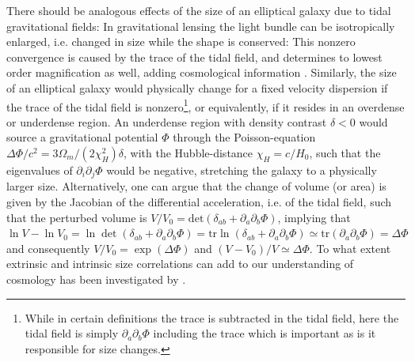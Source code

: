 \documentclass[a4paper,fleqn,usenatbib]{mnras}
\begin{document}
There should be analogous effects of the size of an elliptical galaxy due to tidal gravitational fields: In gravitational lensing the light bundle can be isotropically enlarged, i.e. changed in size while the shape is conserved: This nonzero convergence is caused by the trace of the tidal field, and determines to lowest order magnification as well, adding cosmological information \cite{Huff:2011cq, takahashi_probability_2011}. Similarly, the size of an elliptical galaxy would physically change for a fixed velocity dispersion if the trace of the tidal field is nonzero\footnote{While in certain definitions the trace is subtracted in the tidal field, here the tidal field is simply $\partial_a\partial_b\Phi$ including the trace which is important as is it responsible for size changes.}, or equivalently, if it resides in an overdense or underdense region. An underdense region with density contrast $\delta < 0$ would source a gravitational potential $\Phi$ through the Poisson-equation $\Delta\Phi/c^2 = 3\Omega_m/(2\chi_H^2)\delta$, with the Hubble-distance $\chi_H = c/H_0$, such that the eigenvalues of $\partial_i\partial_j\Phi$ would be negative, stretching the galaxy to a physically larger size. Alternatively, one can argue that the change of volume (or area) is given by the Jacobian of the differential acceleration, i.e. of the tidal field, such that the perturbed volume is $V/V_0 = \mathrm{det}(\delta_{ab} + \partial_a\partial_b\Phi)$, implying that $\ln V-\ln V_0 = \ln\det(\delta_{ab} + \partial_a\partial_b\Phi) = \mathrm{tr}\ln(\delta_{ab} + \partial_a\partial_b\Phi) \simeq \mathrm{tr}(\partial_a\partial_b\Phi) = \Delta\Phi$ and consequently $V/V_0 = \exp(\Delta\Phi)$ and $(V-V_0)/V \simeq\Delta\Phi$. To what extent extrinsic and intrinsic size correlations can add to our understanding of cosmology has been investigated by \citet{heavens_combining_2013}.
\end{document}
